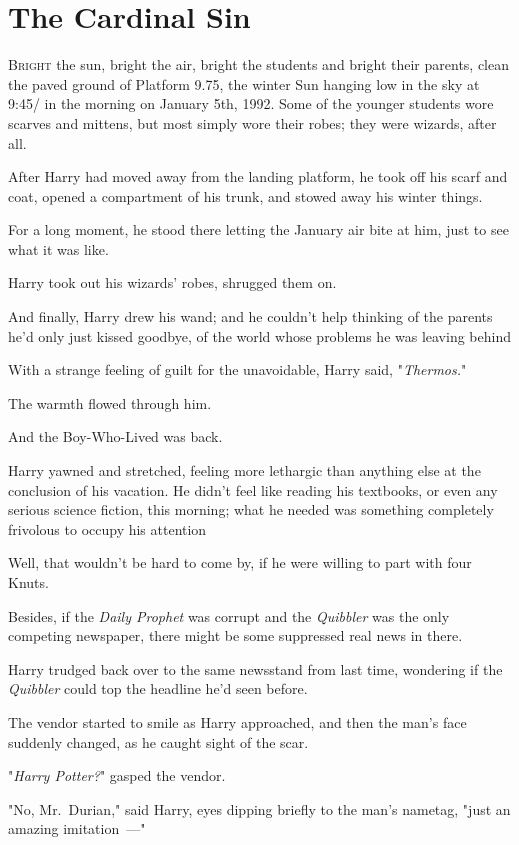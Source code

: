 \chapter{The Cardinal Sin}

\lettrine{B}{right} the sun,
bright the air, bright the students and bright their parents, clean the paved
ground of Platform 9.75, the winter Sun hanging low in the sky at 9:45\AM/ in the
morning on January 5th, 1992. Some of the younger students wore scarves and
mittens, but most simply wore their robes; they were wizards, after all.

After Harry had moved away from the landing platform, he took off his scarf and
coat, opened a compartment of his trunk, and stowed away his winter things.

For a long moment, he stood there letting the January air bite at him, just to
see what it was like.

Harry took out his wizards' robes, shrugged them on.

And finally, Harry drew his wand; and he couldn't help thinking of the parents
he'd only just kissed goodbye, of the world whose problems he was leaving
behind{\el}

With a strange feeling of guilt for the unavoidable, Harry said,
"\emph{Thermos.}"

The warmth flowed through him.

And the Boy-Who-Lived was back.

Harry yawned and stretched, feeling more lethargic than anything else at the
conclusion of his vacation. He didn't feel like reading his textbooks, or even
any serious science fiction, this morning; what he needed was something
completely frivolous to occupy his attention{\el}

Well, that wouldn't be hard to come by, if he were willing to part with four
Knuts.

Besides, if the \emph{Daily Prophet} was corrupt and the \emph{Quibbler} was
the only competing newspaper, there might be some suppressed real news in there.

Harry trudged back over to the same newsstand from last time, wondering if the
\emph{Quibbler} could top the headline he'd seen before.

The vendor started to smile as Harry approached, and then the man's face
suddenly changed, as he caught sight of the scar.

"\emph{Harry Potter?}" gasped the vendor.

"No, Mr.~Durian," said Harry, eyes dipping briefly to the man's nametag, "just
an amazing imitation~---"

